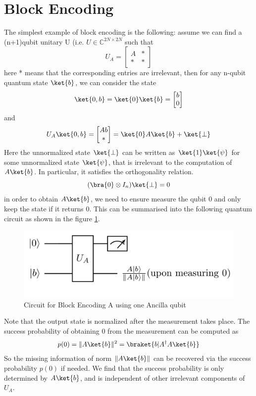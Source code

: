 \documentclass[12pt, oneside]{book}
\theoremstyle{definition}
\theoremstyle{definition}
\theoremstyle{remark}
\begin{document}
\section{Block Encoding}
The simplest example of block encoding is the following: assume we can find a (n+1)qubit unitary U (i.e. $U\in\mathbb{C}^{2N \times 2N}$ such that
\[
U_A=\begin{bmatrix}A & * \\ * & * \end{bmatrix}
\]
here * means that the corresponding entries are irrelevant, then for any n-qubit quantum state $\ket{b}$, we can consider the state
\[
\ket{0,b}=\ket{0}\ket{b}=\begin{bmatrix}b \\ 0 \end{bmatrix}
\]
and
\[
U_A\ket{0,b}=\begin{bmatrix}Ab\\ * \end{bmatrix}=\ket{0}A\ket{b}+\ket{\perp}
\]
Here the unnormalized state $\ket{\perp}$ can be written as $\ket{1}\ket{\psi}$ for some unnormalized state $\ket{\psi}$, that is irrelevant to the computation of $A\ket{b}$. In particular, it satisfies the orthogonality relation.
\[
(\bra{0}\otimes I_n)\ket{\perp}=0
\]
in order to obtain $A\ket{b}$, we need to ensure measure the qubit 0 and only keep the state if it returns 0. This can be summarised into the following quantum circuit as shown in the figure \ref{fig:blockencodingcircuit}.
\begin{figure}[H]
    \centering
    \includegraphics[width=1\linewidth]{../images/blockencodingcircuit.png}
    \caption{Circuit for Block Encoding A using one Ancilla qubit}
    \label{fig:blockencodingcircuit}
\end{figure}
Note that the output state is normalized after the measurement takes place. The success probability of obtaining 0 from the measurement can be computed as
\[
p(0)=\|A\ket{b}\|^2=\braket{b|A^{\dagger}A\ket{b}}
\]
So the missing information of norm $\|A\ket{b}\|$ can be recovered via the success probability $p(0)$ if needed. We find that the success probability is only determined by $A\ket{b}$, and is independent of other irrelevant components of $U_A$.
\end{document}
